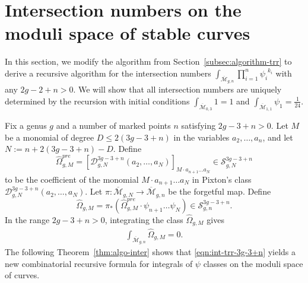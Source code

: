 \documentclass[12pt,reqno]{amsart}
\theoremstyle{plain}
\theoremstyle{definition}
\theoremstyle{remark}
\begin{document}
\section{Intersection numbers on the moduli space of stable curves}
\label{sec:inter-number-mgn}

In this section, we modify the algorithm from Section~\ref{subsec:algorithm-trr} to derive a recursive algorithm for the intersection numbers $\int_{\overline{\mathcal{M}}_{g,n}}\prod_{i=1}^{n}{\psi_i}^{k_i}$ with any $2g-2+n>0$.
We will show that all intersection numbers are uniquely determined by the recursion with initial conditions $\int_{\overline{\mathcal{M}}_{0,3}}1=1$ and $\int_{\overline{\mathcal{M}}_{1,1}}\psi_1=\frac{1}{24}$.

Fix a genus $g$
and a number of marked points $n$ satisfying $2g-3+n>0$. Let $M$ be a monomial of degree
$D\leq 2(3g-3+n)$ in the variables $a_2,\dots,a_n$, and let
$N:=n+2(3g-3+n)-D$. Define
\[\widehat{\Omega}^{pre}_{g,M}=[\mathcal{D}_{g,N}^{3g-3+n}(a_2,\dots,a_N)]_{M\cdot a_{n+1}\dots a_{N}}\in \mathcal{S}_{g,N}^{3g-3+n}\]
to be the coefficient of the monomial $M\cdot a_{n+1}\dots a_N$ in Pixton’s class $\mathcal{D}_{g,N}^{3g-3+n}(a_2,\dots,a_N)$. 
Let $\pi\colon \overline{\mathcal{M}}_{g,N}\rightarrow \overline{\mathcal{M}}_{g,n}$ be the forgetful map. Define 
\[\widehat{\Omega}_{g,M}=\pi_*\left(\widehat{\Omega}_{g,M}^{pre}\cdot \psi_{n+1}\dots\psi_{N}\right)\in \mathcal{S}^{3g-3+n}_{g,n}.\]
In the range $2g-3+n>0$, integrating the class $\widehat{\Omega}_{g,M}$ gives
\begin{align}\label{eqn:int-trr-3g-3+n}
\int_{\overline{\mathcal{M}}_{g,n}}\widehat{\Omega}_{g,M} =0. 
\end{align}
The following Theorem~\ref{thm:algo-inter} shows that \eqref{eqn:int-trr-3g-3+n}
yields a new combinatorial recursive formula for integrals
of $\psi$ classes on the moduli space of curves. 
\end{document}
